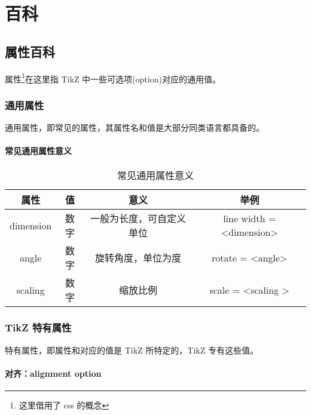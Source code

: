 \chapter{百科}
\section{属性百科}

属性\footnote{这里借用了 css 的概念}在这里指 TikZ 中一些可选项(option)对应的通用值。

\subsection{通用属性}

通用属性，即常见的属性，其属性名和值是大部分同类语言都具备的。

\subsubsection{常见通用属性意义}

\begin{table}[H]
    \centering
    \caption{常见通用属性意义}
    \label{table:常见通用属性意义}
    \setlength{\tabcolsep}{5mm}
    \begin{tabular}{c|ccc}
        \toprule
        \textbf{属性} & \textbf{值} & \textbf{意义} & \textbf{举例}\\
        \midrule
        dimension & 数字 & 一般为长度，可自定义单位 & line width = <dimension>\\
        angle & 数字 & 旋转角度，单位为度 & rotate = <angle> \\
        scaling & 数字 & 缩放比例 & scale = <scaling  > \\
        \bottomrule
    \end{tabular}
\end{table}


\subsection{TikZ 特有属性}

特有属性，即属性和对应的值是 TikZ 所特定的，TikZ 专有这些值。

\subsubsection{对齐：alignment option }

